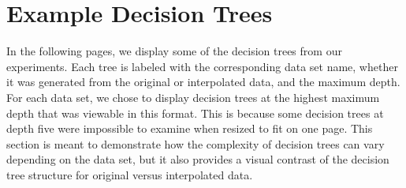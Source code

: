 \documentclass{sig-alternate}
\begin{document}
\appendix
\section{Example Decision Trees}
In the following pages, we display some of the decision trees from our experiments. Each tree is labeled with the corresponding data set name, whether it was generated from the original or interpolated data, and the maximum depth. For each data set, we chose to display decision trees at the highest maximum depth that was viewable in this format. This is because some decision trees at depth five were impossible to examine when resized to fit on one page. This section is meant to demonstrate how the complexity of decision trees can vary depending on the data set, but it also provides a visual contrast of the decision tree structure for original versus interpolated data.
\end{document}
